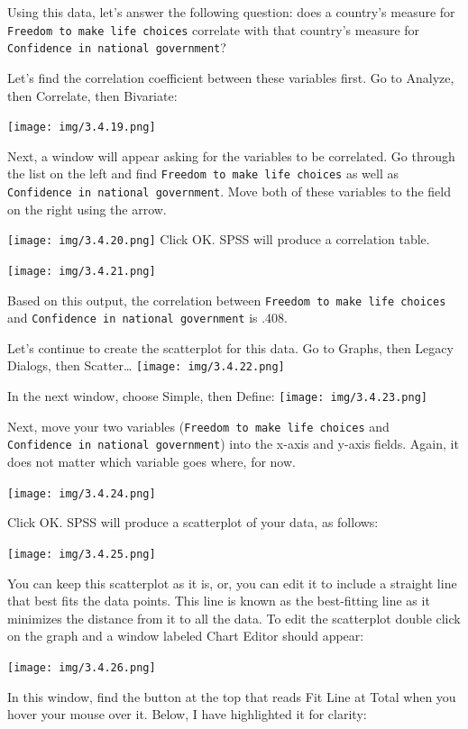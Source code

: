 \documentclass[
]{book}
\begin{document}
Using this data, let's answer the following question: does a country's measure for \texttt{Freedom\ to\ make\ life\ choices} correlate with that country's measure for \texttt{Confidence\ in\ national\ government}?

Let's find the correlation coefficient between these variables first. Go to {Analyze}, then {Correlate}, then {Bivariate}:

\texttt{[image: img/3.4.19.png]}

Next, a window will appear asking for the variables to be correlated. Go through the list on the left and find \texttt{Freedom\ to\ make\ life\ choices} as well as \texttt{Confidence\ in\ national\ government}. Move both of these variables to the field on the right using the arrow.

\texttt{[image: img/3.4.20.png]}
Click OK. SPSS will produce a correlation table.

\texttt{[image: img/3.4.21.png]}

Based on this output, the correlation between \texttt{Freedom\ to\ make\ life\ choices} and \texttt{Confidence\ in\ national\ government} is .408.

Let's continue to create the scatterplot for this data. Go to {Graphs}, then {Legacy Dialogs}, then {Scatter\ldots{}}
\texttt{[image: img/3.4.22.png]}

In the next window, choose {Simple}, then {Define}:
\texttt{[image: img/3.4.23.png]}

Next, move your two variables (\texttt{Freedom\ to\ make\ life\ choices} and \texttt{Confidence\ in\ national\ government}) into the x-axis and y-axis fields. Again, it does not matter which variable goes where, for now.

\texttt{[image: img/3.4.24.png]}

Click {OK}. SPSS will produce a scatterplot of your data, as follows:

\texttt{[image: img/3.4.25.png]}

You can keep this scatterplot as it is, or, you can edit it to include a straight line that best fits the data points. This line is known as the best-fitting line as it minimizes the distance from it to all the data. To edit the scatterplot double click on the graph and a window labeled Chart Editor should appear:

\texttt{[image: img/3.4.26.png]}

In this window, find the button at the top that reads {Fit Line at Total} when you hover your mouse over it. Below, I have highlighted it for clarity:
\end{document}
